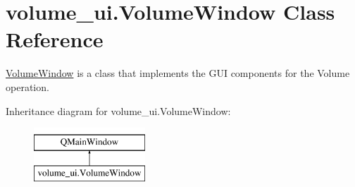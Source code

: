 \hypertarget{classvolume__ui_1_1_volume_window}{}\section{volume\+\_\+ui.\+Volume\+Window Class Reference}
\label{classvolume__ui_1_1_volume_window}


\hyperlink{classvolume__ui_1_1_volume_window}{Volume\+Window} is a class that implements the G\+UI components for the Volume operation.  


Inheritance diagram for volume\+\_\+ui.\+Volume\+Window\+:\begin{figure}[H]
\begin{center}
\leavevmode
\includegraphics[height=2.000000cm]{classvolume__ui_1_1_volume_window}
\end{center}
\end{figure}
